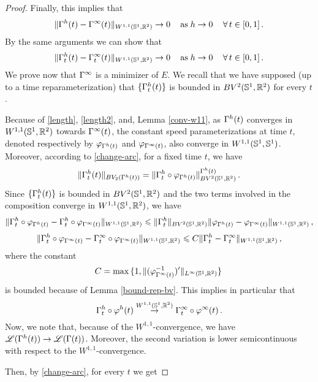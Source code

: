 \begin{proof}
Finally, this implies that 
\begin{equation}\label{cons-length}
\|\Gamma^h(t) -\Gamma^\infty(t)\|_{{W^{1,1}(\mathbb{S}^1,\mathbb{R}^2)}}\rightarrow 0\,\quad \mbox{as}\; h\rightarrow 0\,\quad \forall\,t\in [0,1]\,.
\end{equation}
By the same arguments we can show that
\begin{equation}\label{conv-v}
\| \Gamma^h_t(t) -\Gamma^\infty_t(t)\|_{W^{1,1}(\mathbb{S}^1,\mathbb{R}^2)}\rightarrow 0\,\quad \mbox{as}\; h\rightarrow 0\,\quad \forall\,t\in [0,1]\,.
\end{equation}
We prove now that $\Gamma^\infty$ is a minimizer of $E$.  
We recall that we have supposed (up to a time reparameterization) that   $\{\Gamma^h_t(t)\}$ is bounded in $BV^2(\mathbb{S}^1,\mathbb{R}^2)$ for every $t$. 
\par Because of \eqref{length}, \eqref{length2}, and, Lemma \ref{conv-w11}, as   $\Gamma^h(t)$ converges in $W^{1,1}(\mathbb{S}^1,\mathbb{R}^2)$ towards $\Gamma^\infty(t)$,  the constant speed parameterizations at time $t$, denoted respectively by  $\varphi_{\Gamma^h(t)}$ and $\varphi_{\Gamma^\infty(t)}$, also converge in $W^{1,1}(\mathbb{S}^1, \mathbb{S}^1)$. Moreover, according to \eqref{change-arc}, for a fixed time $t$, we have
$$ \|\Gamma^{h}_t(t)\|_{BV_2(\Gamma^h(t))} =  \|\Gamma^{h}_t \circ \varphi_{\Gamma^h(t)}\|^{\Gamma^h(t)}_{BV^2(\mathbb{S}^1,\mathbb{R}^2)}\,.$$
Since $\{\Gamma^h_t(t)\}$ is bounded in $BV^2(\mathbb{S}^1,\mathbb{R}^2)$ and  the two terms involved in the composition  converge in $W^{1,1}(\mathbb{S}^1,\mathbb{R}^2)$, we have
$$\|\Gamma^{h}_t \circ \varphi_{\Gamma^h(t)} - \Gamma^{h}_t \circ \varphi_{\Gamma^\infty(t)}\|_{W^{1,1}(\mathbb{S}^1,\mathbb{R}^2)}\leqslant \|\Gamma^h_t\|_{BV^2(\mathbb{S}^1,\mathbb{R}^2)}\| \varphi_{\Gamma^h(t)} - \varphi_{\Gamma^\infty(t)}\|_{W^{1,1}(\mathbb{S}^1,\mathbb{R}^2)}\,,$$
$$\|\Gamma^{h}_t \circ \varphi_{\Gamma^\infty(t)} -	 \Gamma^{\infty}_t \circ \varphi_{\Gamma^\infty(t)}\|_{W^{1,1}(\mathbb{S}^1,\mathbb{R}^2)}\leqslant C\|\Gamma^{h}_t  -	 \Gamma^{\infty}_t\|_{W^{1,1}(\mathbb{S}^1,\mathbb{R}^2)}\,,$$
where the constant 
$$C=\max\,\{1, \|(\varphi_{\Gamma^\infty(t)}^{-1})'\|_{L^\infty(\mathbb{S}^1,\mathbb{R}^2)}\}\,$$
is bounded because of Lemma \ref{bound-rep-bv}.
This implies in particular that 
\begin{equation}\label{sci2}
\Gamma^{h}_t \circ \varphi^h(t)  \overset{W^{1,1}(\mathbb{S}^1,\mathbb{R}^2)}{\rightarrow} \Gamma^{\infty}_t \circ \varphi^\infty(t)\,.
\end{equation}
Now, we note that, because of the $W^{1,1}$-convergence, we have $\mathscr{L}(\Gamma^h(t))\rightarrow \mathscr{L}(\Gamma(t))$. Moreover,  the second variation is lower semicontinuous with respect to the  $W^{1,1}$-convergence. 

Then, by \eqref{change-arc}, for every  $t$ we get


\end{proof}
